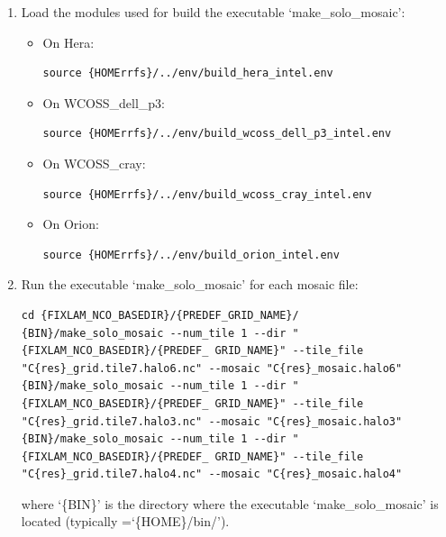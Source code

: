 \documentclass[11pt,fleqn]{report}              %
\begin{document}
\begin{enumerate}

\item Load the modules used for build the executable `make\_solo\_mosaic':
\begin{itemize}
\item On Hera:
\lstset{language=bash}   
\begin{lstlisting}[frame=trBL]
source {HOMErrfs}/../env/build_hera_intel.env
\end{lstlisting}

\item On WCOSS\_dell\_p3:
\lstset{language=bash}   
\begin{lstlisting}[frame=trBL]
source {HOMErrfs}/../env/build_wcoss_dell_p3_intel.env
\end{lstlisting}

\item On WCOSS\_cray:
\lstset{language=bash}   
\begin{lstlisting}[frame=trBL]
source {HOMErrfs}/../env/build_wcoss_cray_intel.env
\end{lstlisting}

\item On Orion:
\lstset{language=bash}   
\begin{lstlisting}[frame=trBL]
source {HOMErrfs}/../env/build_orion_intel.env
\end{lstlisting}

\end{itemize}


\item Run the executable `make\_solo\_mosaic' for each mosaic file:
\lstset{language=bash}   
\begin{lstlisting}[frame=trBL]
cd {FIXLAM_NCO_BASEDIR}/{PREDEF_GRID_NAME}/
{BIN}/make_solo_mosaic --num_tile 1 --dir "{FIXLAM_NCO_BASEDIR}/{PREDEF_ GRID_NAME}" --tile_file "C{res}_grid.tile7.halo6.nc" --mosaic "C{res}_mosaic.halo6"
{BIN}/make_solo_mosaic --num_tile 1 --dir "{FIXLAM_NCO_BASEDIR}/{PREDEF_ GRID_NAME}" --tile_file "C{res}_grid.tile7.halo3.nc" --mosaic "C{res}_mosaic.halo3"
{BIN}/make_solo_mosaic --num_tile 1 --dir "{FIXLAM_NCO_BASEDIR}/{PREDEF_ GRID_NAME}" --tile_file "C{res}_grid.tile7.halo4.nc" --mosaic "C{res}_mosaic.halo4"
\end{lstlisting}
where `\{BIN\}' is the directory where the executable `make\_solo\_mosaic' is located (typically =`\{HOME\}/bin/'). \\

\end{enumerate}
\end{document}
